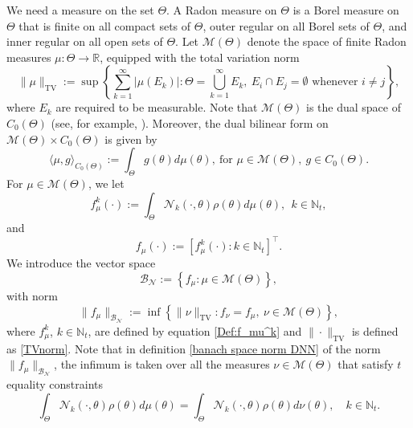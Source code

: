 \documentclass[11pt]{article}
\begin{document}
%
We need a measure on the set $\Theta$.
A Radon measure \cite{folland1999real} on $\Theta$ is a Borel measure on $\Theta$ that is finite on all compact sets of $\Theta$, outer regular on all Borel sets of $\Theta$, and inner regular on all open sets of $\Theta$. Let $\mathcal{M}(\Theta)$ denote the space of finite Radon measures $\mu: \Theta\to \mathbb{R}$, equipped with the total variation norm 
\begin{equation}\label{TVnorm}
    \|\mu\|_{\mathrm{TV}}:=\sup\left\{\sum_{k=1}^\infty\left|\mu(E_k)\right|:\Theta=\bigcup_{k=1}^\infty E_k,\ E_i\cap E_j=\emptyset\text{ whenever }i\neq j \right\},
\end{equation}
where $E_k$ are required to be measurable.
%
Note that  $\mathcal{M}(\Theta)$ is the dual space of  $C_0(\Theta)$ (see, for example, \cite{conway2019course}). Moreover, the dual bilinear form on $\mathcal{M}(\Theta)\times C_0(\Theta)$ is given by 
\begin{equation}\label{DualBilinearForm}
    \langle \mu,g\rangle_{C_0(\Theta)}:=\int_{\Theta} g(\theta)d\mu(\theta),\ \text{for }\mu\in\mathcal{M}(\Theta),\ g\in C_0(\Theta). 
\end{equation}
%
%
For $\mu \in \mathcal{M}(\Theta)$, we let 
\begin{equation}\label{Def:f_mu^k}
    f_{\mu}^k(\cdot):=\int_\Theta \mathcal{N}_k(\cdot,\theta)\rho(\theta)d\mu(\theta), \ \  k\in \mathbb{N}_t, 
\end{equation}
and 
\begin{equation*}\label{vector-valued fmu}
f_\mu(\cdot):=\left[f_{\mu}^k(\cdot): k\in\mathbb{N}_t\right]^\top.
\end{equation*}
We introduce the vector space
\begin{equation}\label{banach space DNN}
    \mathcal{B}_{\mathcal{N}}:=\left\{f_\mu:\mu \in \mathcal{M}(\Theta)\right\},
\end{equation}
with norm 
\begin{equation}\label{banach space norm DNN}
    \|f_\mu\|_{\mathcal{B}_{\mathcal{N}}}:=\inf\left\{\|\nu\|_{\mathrm{TV}}:f_\nu=f_\mu,\ \nu\in\mathcal{M}(\Theta)\right\},
\end{equation}
where $f_\mu^k$, $k\in\mathbb{N}_t$, are defined by equation \eqref{Def:f_mu^k} and $\|\cdot\|_\mathrm{TV}$ is defined as \eqref{TVnorm}. Note that in definition \eqref{banach space norm DNN} of the norm $\|f_\mu\|_{\mathcal{B}_{\mathcal{N}}}$, the infimum is taken over all the measures $\nu\in\mathcal{M}(\Theta)$ that satisfy $t$ equality constraints
\begin{equation*}
    \int_\Theta \mathcal{N}_k(\cdot,\theta)\rho(\theta)d\mu(\theta)=\int_\Theta \mathcal{N}_k(\cdot,\theta)\rho(\theta)d\nu(\theta),\quad k\in\mathbb{N}_t. 
\end{equation*}
\end{document}
